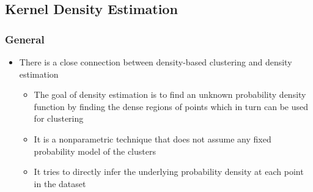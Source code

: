 \documentclass[11pt]{article}
\begin{document}
\subsection{Kernel Density Estimation}
\label{sec:orgaed37a2}
\subsubsection{General}
\label{sec:org45e1f3b}
\begin{itemize}
\item There is a close connection between density-based clustering and density estimation
\begin{itemize}
\item The goal of density estimation is to find an unknown probability density function by finding the dense regions of points which in turn can be used for clustering
\item It is a nonparametric technique that does not assume any fixed probability model of the clusters
\item It tries to directly infer the underlying probability density at each point in the dataset
\end{itemize}
\end{itemize}
\end{document}
